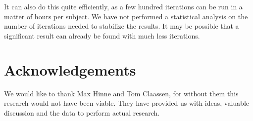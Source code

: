 \documentclass[a4paper, 10pt, english, onecolumn]{article}
\begin{document}
It can also do this quite efficiently, as a few hundred iterations can be run in a matter of hours per subject.
We have not performed a statistical analysis on the number of iterations needed to stabilize the results.
It may be possible that a significant result can already be found with much less iterations.



\section{Acknowledgements}
We would like to thank Max Hinne and Tom Claassen, for without them this research would not have been viable.
They have provided us with ideas, valuable discussion and the data to perform actual research.

{}

\end{document}
